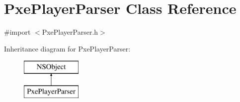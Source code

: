 \hypertarget{interface_pxe_player_parser}{\section{Pxe\-Player\-Parser Class Reference}
\label{interface_pxe_player_parser}
}


{\ttfamily \#import $<$Pxe\-Player\-Parser.\-h$>$}

Inheritance diagram for Pxe\-Player\-Parser\-:\begin{figure}[H]
\begin{center}
\leavevmode
\includegraphics[height=2.000000cm]{interface_pxe_player_parser}
\end{center}
\end{figure}
